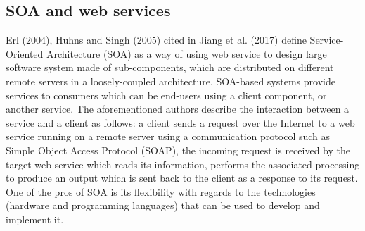 \documentclass{article}
\begin{document}
\begin{multicols}{2}
\subsection{SOA and web services}

Erl (2004), Huhns and Singh (2005) cited in Jiang et al. (2017) define Service-Oriented Architecture (SOA) as a way of using web service to design large software system made of sub-components, which are distributed on different remote servers in a loosely-coupled architecture. SOA-based systems provide services to consumers which can be end-users using a client component, or another service. The aforementioned authors describe the interaction between a service and a client as follows: a client sends a request over the Internet to a web service running on a remote server using a communication protocol such as Simple Object Access Protocol (SOAP), the incoming request is received by the target web service which reads its information, performs the associated processing to produce an output which is sent back to the client as a response to its request. One of the pros of SOA is its flexibility with regards to the technologies (hardware and programming languages) that can be used to develop and implement it.
 

\end{multicols}
\end{document}
